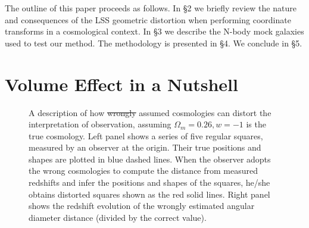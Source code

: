 \documentclass[iop]{emulateapj}
\providecommand{\DIFadd}[1]{{\protect\color{blue}\uwave{#1}}} %
\providecommand{\DIFdel}[1]{{\protect\color{red}\sout{#1}}}                      %
\providecommand{\DIFaddFL}[1]{\DIFadd{#1}} %
\providecommand{\DIFdelFL}[1]{\DIFdel{#1}} %
\providecommand{\DIFaddbeginFL}{} %
\providecommand{\DIFaddendFL}{} %
\providecommand{\DIFdelbeginFL}{} %
\providecommand{\DIFdelendFL}{} %
\begin{document}
The outline of this paper proceeds as follows. 
In \S 2 we briefly review the nature and consequences of the LSS geometric distortion when performing coordinate transforms in a cosmological context. 
In \S 3 we describe the N-body mock galaxies used to test our method.
The methodology is presented in \S 4.
We conclude in \S 5.



\section{Volume Effect in a Nutshell}
\label{sec:Voleffect}

\begin{figure}
   \caption{\label{fig_xyquan}
   A description of how \DIFdelbeginFL \DIFdelFL{wrongly }\DIFdelendFL \DIFaddbeginFL \DIFaddFL{incorrectly }\DIFaddendFL assumed cosmologies can distort the interpretation of observation,
   assuming $\Omega_m=0.26,w=-1$ is the true cosmology. 
   Left panel shows a series of five regular squares, measured by an observer at the origin.
   Their true positions and shapes are plotted in blue dashed lines.
   When the observer adopts the wrong cosmologies to compute the distance from measured redshifts and infer the positions and shapes of the squares,
   he/she obtains distorted squares shown as the red solid lines.
   Right panel shows the redshift evolution of the wrongly estimated angular diameter distance (divided by the correct value).
   }
\end{figure}
\end{document}
